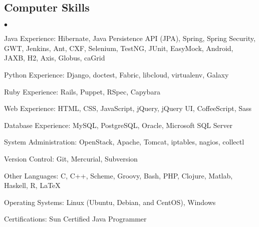 \documentclass[margin,line]{res}
\newenvironment{list2}{
  \begin{list}{$\bullet$}{%
      \setlength{\itemsep}{0in}
      \setlength{\parsep}{0in} \setlength{\parskip}{0in}
      \setlength{\topsep}{0in} \setlength{\partopsep}{0in} 
      \setlength{\leftmargin}{0.2in}}}{\end{list}}
\begin{document}
\begin{resume}
\section{\sc Computer Skills} 
\begin{list2}
\item Java Experience: Hibernate, Java Persistence API (JPA), Spring, Spring Security, GWT, Jenkins, Ant,
CXF, Selenium, TestNG, JUnit, EasyMock, Android, JAXB, H2, Axis, Globus, caGrid
\item Python Experience: Django, doctest, Fabric, libcloud, virtualenv, Galaxy
\item Ruby Experience: Rails, Puppet, RSpec, Capybara
\item Web Experience: HTML, CSS, JavaScript, jQuery, jQuery UI, CoffeeScript, Sass
\item Database Experience: MySQL, PostgreSQL, Oracle, Microsoft SQL Server
\item System Administration: OpenStack, Apache, Tomcat, iptables, nagios, collectl
\item Version Control: Git, Mercurial, Subversion
\item Other Languages: C, C++, Scheme, Groovy, Bash, PHP, Clojure, Matlab, Haskell, R, \LaTeX
\item Operating Systems: Linux (Ubuntu, Debian, and CentOS), Windows
\item Certifications: Sun Certified Java Programmer
%
\end{list2}

\end{resume}
\end{document}
